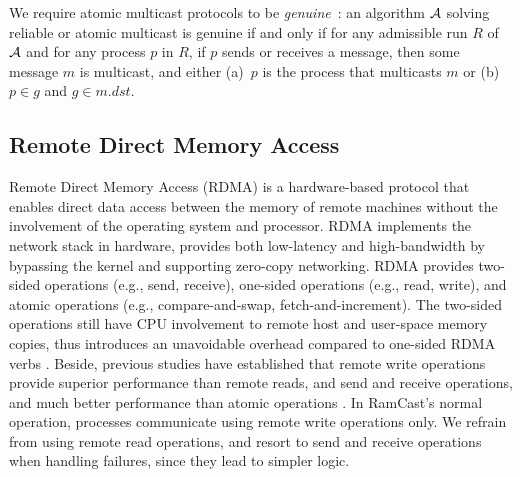 We require atomic multicast protocols to be \emph{genuine}~\cite{GS01b}: 
an algorithm ${\cal A}$ solving reliable or atomic multicast is genuine
if and only if for any admissible run $R$ of ${\cal A}$ and for any process $p$ in $R$, if $p$ sends or receives a message, then some message $m$ is multicast, and either (a)~$p$ is the process that multicasts $m$ or (b)~$p \in g$ and $g \in m.dst$.


\subsection{Remote Direct Memory Access}
\label{sec:rdma}

Remote Direct Memory Access (RDMA) is a hardware-based protocol that enables direct data access between the memory of remote machines without the involvement of the operating system and processor. 
RDMA implements the network stack in hardware, provides both low-latency and high-bandwidth by bypassing the kernel and supporting zero-copy networking.
RDMA provides two-sided operations (e.g., send, receive), one-sided operations (e.g., read, write), and atomic operations (e.g., compare-and-swap, fetch-and-increment). The two-sided operations still have CPU involvement to remote host and user-space memory copies, thus introduces an unavoidable overhead compared to one-sided RDMA verbs \cite{FaRM}.
Beside, previous studies have established that remote write operations provide superior performance than remote reads, and send and receive operations, and much better performance than atomic operations \cite{kalia2014using, kalia2016design, mitchell2013using}.
In RamCast's normal operation, processes communicate using remote write operations only.
We refrain from using remote read operations, and resort to send and receive operations when handling failures, since they lead to simpler logic.

